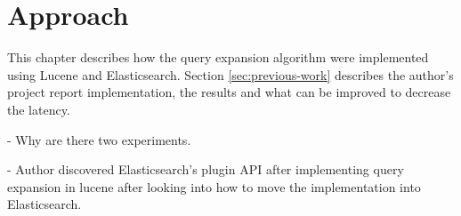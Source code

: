 \chapter{Approach}
\label{ch:approach}
This chapter describes how the query expansion algorithm were implemented using Lucene and Elasticsearch.
Section \ref{sec:previous-work} describes the author's project report \cite{project-report} implementation,
the results and what can be improved to decrease the latency.

- Why are there two experiments.

- Author discovered Elasticsearch's plugin API after implementing query expansion in lucene after looking into how to move the implementation into Elasticsearch.


